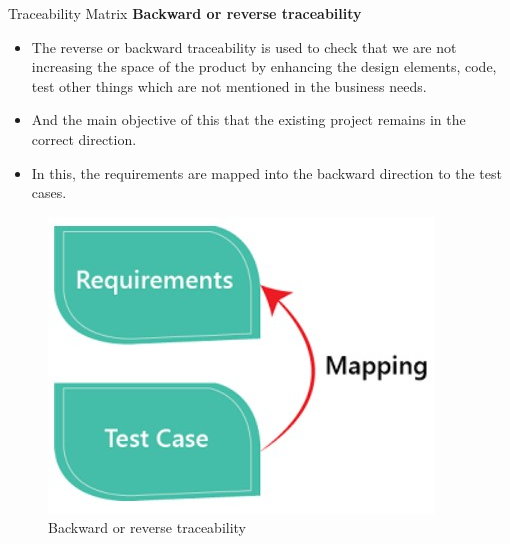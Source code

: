 \documentclass{beamer}
\begin{document}
\begin{frame}{Traceability Matrix}
	\textbf{Backward or reverse traceability }
	\begin{itemize}
		\item The reverse or backward traceability is used to check that we are not increasing the space of the product by enhancing the design elements, code, test other things which are not mentioned in the business needs. 
		\item And the main objective of this that the existing project remains in the correct direction. 
		\item In this, the requirements are mapped into the backward direction to the test cases.
	\end{itemize}
	\begin{figure}
		\includegraphics[scale=.5]{img/m2_14.jpg}
		\caption{Backward or reverse traceability}
	\end{figure}
\end{frame}
\end{document}
